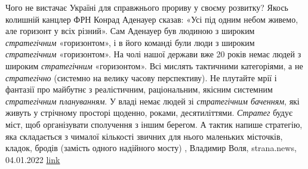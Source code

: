 Чого не вистачає Україні для справжнього прориву у своєму розвитку?  Якось
колишній канцлер ФРН Конрад Аденауер сказав: «Усі під одним небом живемо, але
горизонт у всіх різний».  Сам Аденауер був людиною з широким
\emph{стратегічним} «горизонтом», і в його команді були люди з широким
\emph{стратегічним} «горизонтом».  На чолі нашої держави вже 20 років немає
людей з широким \emph{стратегічним} «горизонтом». Всі мислять тактичними
категоріями, а не \emph{стратегічно} (системно на велику часову перспективу).
Не плутайте мрії і фантазії про майбутнє з реалістичним, раціональним, якісним
системним \emph{стратегічним плануванням}.  У владі немає людей зі
\emph{стратегічним баченням}, які живуть у стрічному просторі щоденно, роками,
десятиліттями.  \emph{Стратег} будує міст, щоб організувати сполучення з іншим
берегом. А тактик напише стратегію, яка складається з чималої кількості звичних
для нього маленьких місточків, кладок, бродів (замість одного надійного мосту)
, 
Владимир Воля, strana.news, 04.01.2022
\href{https://strana.news/opinions/370202-cheho-ne-khvataet-ukraine-dlja-nastojashcheho-proryva-v-svoem-razvitii.html}{link}
